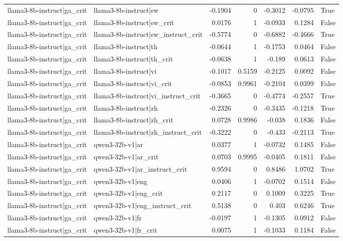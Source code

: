\begin{table}
\begin{tabular}{l l r r r r l}
llama3-8b-instruct|ga_crit & llama3-8b-instruct|sw & -0.1904 & 0 & -0.3012 & -0.0795 & True \\
llama3-8b-instruct|ga_crit & llama3-8b-instruct|sw_crit & 0.0176 & 1 & -0.0933 & 0.1284 & False \\
llama3-8b-instruct|ga_crit & llama3-8b-instruct|sw_instruct_crit & -0.5774 & 0 & -0.6882 & -0.4666 & True \\
llama3-8b-instruct|ga_crit & llama3-8b-instruct|th & -0.0644 & 1 & -0.1753 & 0.0464 & False \\
llama3-8b-instruct|ga_crit & llama3-8b-instruct|th_crit & -0.0638 & 1 & -0.189 & 0.0613 & False \\
llama3-8b-instruct|ga_crit & llama3-8b-instruct|vi & -0.1017 & 0.5159 & -0.2125 & 0.0092 & False \\
llama3-8b-instruct|ga_crit & llama3-8b-instruct|vi_crit & -0.0853 & 0.9961 & -0.2104 & 0.0399 & False \\
llama3-8b-instruct|ga_crit & llama3-8b-instruct|vi_instruct_crit & -0.3665 & 0 & -0.4774 & -0.2557 & True \\
llama3-8b-instruct|ga_crit & llama3-8b-instruct|zh & -0.2326 & 0 & -0.3435 & -0.1218 & True \\
llama3-8b-instruct|ga_crit & llama3-8b-instruct|zh_crit & 0.0728 & 0.9986 & -0.038 & 0.1836 & False \\
llama3-8b-instruct|ga_crit & llama3-8b-instruct|zh_instruct_crit & -0.3222 & 0 & -0.433 & -0.2113 & True \\
llama3-8b-instruct|ga_crit & qwen3-32b-v1|ar & 0.0377 & 1 & -0.0732 & 0.1485 & False \\
llama3-8b-instruct|ga_crit & qwen3-32b-v1|ar_crit & 0.0703 & 0.9995 & -0.0405 & 0.1811 & False \\
llama3-8b-instruct|ga_crit & qwen3-32b-v1|ar_instruct_crit & 0.9594 & 0 & 0.8486 & 1.0702 & True \\
llama3-8b-instruct|ga_crit & qwen3-32b-v1|eng & 0.0406 & 1 & -0.0702 & 0.1514 & False \\
llama3-8b-instruct|ga_crit & qwen3-32b-v1|eng_crit & 0.2117 & 0 & 0.1009 & 0.3225 & True \\
llama3-8b-instruct|ga_crit & qwen3-32b-v1|eng_instruct_crit & 0.5138 & 0 & 0.403 & 0.6246 & True \\
llama3-8b-instruct|ga_crit & qwen3-32b-v1|fr & -0.0197 & 1 & -0.1305 & 0.0912 & False \\
llama3-8b-instruct|ga_crit & qwen3-32b-v1|fr_crit & 0.0075 & 1 & -0.1033 & 0.1184 & False \\

\end{tabular}
\end{table}
